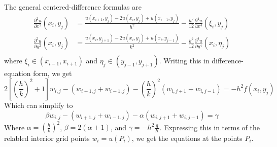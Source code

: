 \documentclass[12pt]{article}
\begin{document}
\hfill

The general centered-difference formulas are
\begin{equation}
  \label{eq:8_gencentdiff}
  \begin{aligned}
    \frac{\partial^2u}{\partial x^2}(x_i,y_j) &=
    \frac{u(x_{i+1},y_{j})-2u(x_{i},y_{j}) + u(x_{i-1},y_{j})}{h^2} -
    \frac{h^2}{12}\frac{\partial^4u}{\partial x^4}(\xi_i,y_j) \\
    \frac{\partial^2u}{\partial y^2}(x_i,y_j) &=
    \frac{u(x_{i},y_{j+1})-2u(x_{i},y_{j}) + u(x_{i},y_{j-1})}{k^2} -
    \frac{k^2}{12}\frac{\partial^4u}{\partial y^4}(x_i,\eta_j) \\
  \end{aligned}
\end{equation}
where $\xi_i \in (x_{i-1},x_{i+1})$ and $\eta_j \in
(y_{j-1},y_{j+1})$.
Writing this in difference-equation form, we get
\begin{equation}
  \label{eq:findiffcentdiff}
  2\left[\left(\frac{h}{k}\right)^2+1\right]w_{i,j}-(w_{i+1,j}+w_{i-1,j})
  - \left(\frac{h}{k}\right)^2(w_{i,j+1}+w_{i,j-1})=-h^2f(x_i,y_j)
\end{equation}
Which can simplify to 
\begin{equation}
  \label{eq:findiffcentdiffsimp}
    \beta w_{i,j}-(w_{i+1,j}+w_{i-1,j})
  - \alpha (w_{i,j+1}+w_{i,j-1})=\gamma
\end{equation}
Where $\alpha=\left(\frac{h}{k}\right)^2$, $\beta=2(\alpha+1)$, and
$\gamma=-h^2\frac{q}{K}$. Expressing this in terms of the relabled
interior grid points $w_i=u(P_i)$, we get the equations at the points
$P_i$.
\end{document}
